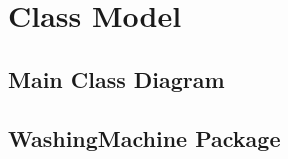 \chapter{Class Model}

\begin{landscape}
\section{Main Class Diagram}
\thispagestyle{empty}
\end{landscape}

\begin{landscape}
\section{WashingMachine Package}
\thispagestyle{empty}
\end{landscape}